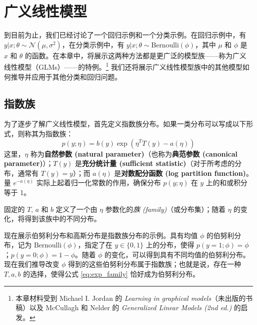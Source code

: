 \chapter{广义线性模型}
到目前为止，我们已经讨论了一个回归示例和一个分类示例。在回归示例中，有 $y|x; \theta \sim \mathcal{N}(\mu, \sigma^2)$，在分类示例中，有 $y|x; \theta \sim \text{Bernoulli}(\phi)$，其中 $\mu$ 和 $\phi$ 是 $x$ 和 $\theta$ 的函数。在本章中，将展示这两种方法都是更广泛的模型族——称为广义线性模型（GLMs）——的特例。\footnote{本章材料受到 Michael I. Jordan 的 \textit{Learning in graphical models}（未出版的书稿）以及 McCullagh 和 Nelder 的 \textit{Generalized Linear Models (2nd ed.)} 的启发。} 我们还将展示广义线性模型族中的其他模型如何推导并应用于其他分类和回归问题。

\section{指数族}

为了逐步了解广义线性模型，首先定义指数族分布。如果一类分布可以写成以下形式，则称其为指数族：
\begin{equation}
    p(y; \eta) = b(y) \exp(\eta^T T(y) - a(\eta))
    \label{eq:exp_family}
\end{equation}
这里，$\eta$ 称为\textbf{自然参数 (natural parameter)}（也称为\textbf{典范参数 (canonical parameter)}）；$T(y)$ 是\textbf{充分统计量 (sufficient statistic)}（对于所考虑的分布，通常有 $T(y)=y$）；而 $a(\eta)$ 是\textbf{对数配分函数 (log partition function)}。量 $e^{-a(\eta)}$ 实际上起着归一化常数的作用，确保分布 $p(y; \eta)$ 在 $y$ 上的和或积分等于 1。

固定的 $T$, $a$ 和 $b$ 定义了一个由 $\eta$ 参数化的\textit{族 (family)}（或分布集）；随着 $\eta$ 的变化，将得到该族中的不同分布。

现在展示伯努利分布和高斯分布是指数族分布的示例。具有均值 $\phi$ 的伯努利分布，记为 $\text{Bernoulli}(\phi)$，指定了在 $y \in \{0, 1\}$ 上的分布，使得 $p(y=1; \phi) = \phi$；$p(y=0; \phi) = 1-\phi$。随着 $\phi$ 的变化，可以得到具有不同均值的伯努利分布。现在我们推导改变 $\phi$ 得到的这些伯努利分布属于指数族；也就是说，存在一种 $T, a, b$ 的选择，使得公式 \eqref{eq:exp_family} 恰好成为伯努利分布。

